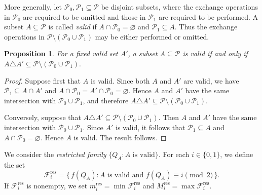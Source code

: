 \documentclass[12pt]{article}
\newtheorem{proposition}[theorem]{Proposition}
\theoremstyle{definition}
\begin{document}
More generally, let $\mathcal P_0,\mathcal P_1\subseteq\mathcal P$ be disjoint subsets, where the exchange operations in $\mathcal P_0$ are required to be omitted and those in $\mathcal P_1$ are required to be performed. A subset $A\subseteq\mathcal P$ is called \emph{valid} if $A\cap\mathcal P_0=\varnothing$ and $\mathcal P_1\subseteq A$. Thus the exchange operations in $\mathcal P\setminus(\mathcal P_0\cup\mathcal P_1)$ may be either performed or omitted.

\begin{proposition}\label{prop4:1}
 For a fixed valid set $A'$, a subset $A\subseteq\mathcal P$ is valid
if and only if $
A\triangle A'
\subseteq
\mathcal P\setminus(\mathcal P_0\cup\mathcal P_1).
$
\end{proposition}
\begin{proof}
Suppose first that $A$ is valid. Since both $A$ and $A'$ are valid,
we have $\mathcal P_1\subseteq A\cap A'$ and
$A\cap\mathcal P_0=A'\cap\mathcal P_0=\varnothing$. Hence $A$ and
$A'$   have the same intersection with
$\mathcal P_0\cup\mathcal P_1$, and therefore
$A\triangle A'\subseteq
\mathcal P\setminus(\mathcal P_0\cup\mathcal P_1)$.

Conversely, suppose that
$A\triangle A'\subseteq
\mathcal P\setminus(\mathcal P_0\cup\mathcal P_1)$.
Then $A$ and $A'$  have the same intersection with
$\mathcal P_0\cup\mathcal P_1$. Since $A'$ is valid, it follows that
$\mathcal P_1\subseteq A$ and
$A\cap\mathcal P_0=\varnothing$. Hence $A$ is valid. The result follows.
\end{proof}


We consider the \textit{restricted family}
$\{Q_A:  A \text{ is valid}\}$.
For each $i\in\{0,1\}$, we define the set
\[
\mathcal F_i^{\mathrm{res}} = \big\{\,f(Q_A) : A \text{ is valid and } f(Q_A)\equiv i\pmod{2}\,\big\}.
\]
If $\mathcal F_i^{\mathrm{res}}$ is nonempty, we set $m_i^{\mathrm{res}} = \min\mathcal F_i^{\mathrm{res}}$ and $M_i^{\mathrm{res}} = \max\mathcal F_i^{\mathrm{res}}$.
\end{document}
